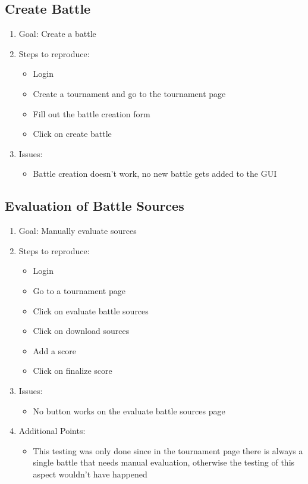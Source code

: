 \subsection{Create Battle}
\begin{enumerate}
    \item Goal: Create a battle
    \item Steps to reproduce:
        \begin{itemize}
            \item Login
            \item Create a tournament and go to the tournament page
            \item Fill out the battle creation form
            \item Click on create battle
        \end{itemize}
    \item Issues:
        \begin{itemize}
            \item Battle creation doesn't work, no new battle gets added to the GUI
        \end{itemize}
\end{enumerate}


\subsection{Evaluation of Battle Sources}
\begin{enumerate}
    \item Goal: Manually evaluate sources
    \item Steps to reproduce:
        \begin{itemize}
            \item Login
            \item Go to a tournament page
            \item Click on evaluate battle sources
            \item Click on download sources
            \item Add a score 
            \item Click on finalize score
        \end{itemize}
    \item Issues:
        \begin{itemize}
            \item No button works on the evaluate battle sources page
        \end{itemize}
    \item Additional Points:
        \begin{itemize}
            \item This testing was only done since in the tournament page there is always a single battle that needs manual evaluation, otherwise the testing of this aspect wouldn't have happened
        \end{itemize}
\end{enumerate}

